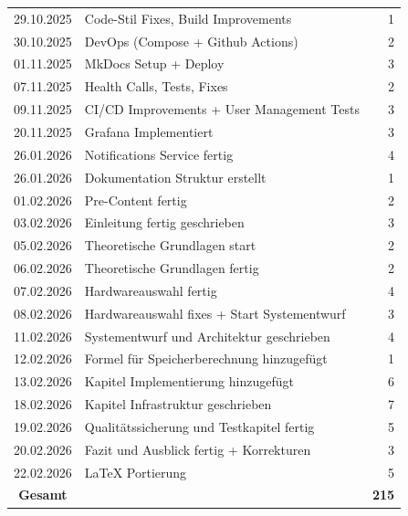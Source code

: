 \begin{longtable}{|c|l|r|}
    29.10.2025      & Code-Stil Fixes, Build Improvements            & 1                         \\
    30.10.2025      & DevOps (Compose + Github Actions)              & 2                         \\
    01.11.2025      & MkDocs Setup + Deploy                          & 3                         \\
    07.11.2025      & Health Calls, Tests, Fixes                     & 2                         \\
    09.11.2025      & CI/CD Improvements + User Management Tests     & 3                         \\
    20.11.2025      & Grafana Implementiert                          & 3                         \\
    26.01.2026      & Notifications Service fertig                   & 4                         \\
    26.01.2026      & Dokumentation Struktur erstellt                & 1                         \\
    01.02.2026      & Pre-Content fertig                             & 2                         \\
    03.02.2026      & Einleitung fertig geschrieben                  & 3                         \\
    05.02.2026      & Theoretische Grundlagen start                  & 2                         \\
    06.02.2026      & Theoretische Grundlagen fertig                 & 2                         \\
    07.02.2026      & Hardwareauswahl fertig                         & 4                         \\
    08.02.2026      & Hardwareauswahl fixes + Start Systementwurf    & 3                         \\
    11.02.2026      & Systementwurf und Architektur geschrieben      & 4                         \\
    12.02.2026      & Formel für Speicherberechnung hinzugefügt      & 1                         \\
    13.02.2026      & Kapitel Implementierung hinzugefügt            & 6                         \\
    18.02.2026      & Kapitel Infrastruktur geschrieben              & 7                         \\
    19.02.2026      & Qualitätssicherung und Testkapitel fertig      & 5                         \\
    20.02.2026      & Fazit und Ausblick fertig + Korrekturen        & 3                         \\
    22.02.2026      & LaTeX Portierung                               & 5                         \\
    \hline
    \textbf{Gesamt} &                                                & \textbf{215}              \\
    \hline
\end{longtable}


%
\newpage 
\listoffigures 
%
\newpage 
\lstlistoflistings
%
\glsaddallunused
\newpage
\printnoidxglossary[type=\acronymtype, title={Abkürzungsverzeichnis}, sort=letter]
%
\newpage
